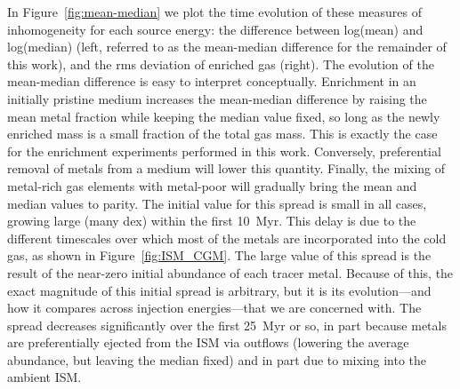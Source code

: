 \documentclass[twocolumn]{aastex62}
\begin{document}

In Figure~\ref{fig:mean-median} we plot the time evolution of these measures of inhomogeneity for each source energy: the difference between log(mean) and log(median) (left, referred to as the mean-median difference for the remainder of this work), and the rms deviation of enriched gas (right). The evolution of the mean-median difference is easy to interpret conceptually. Enrichment in an initially pristine medium increases the mean-median difference by raising the mean metal fraction while keeping the median value fixed, so long as the newly enriched mass is a small fraction of the total gas mass. This is exactly the case for the enrichment experiments performed in this work. Conversely, preferential removal of metals from a medium will lower this quantity. Finally, the mixing of metal-rich gas elements with metal-poor will gradually bring the mean and median values to parity. The initial value for this spread is small in all cases, growing large (many dex) within the first 10~Myr. This delay is due to the different timescales over which most of the metals are incorporated into the cold gas, as shown in Figure~\ref{fig:ISM_CGM}. The large value of this spread is the result of the near-zero initial abundance of each tracer metal. Because of this, the exact magnitude of this initial spread is arbitrary, but it is its evolution---and how it compares across injection energies---that we are concerned with. The spread decreases significantly over the first 25~Myr or so, in part because metals are preferentially ejected from the ISM via outflows (lowering the average abundance, but leaving the median fixed) and in part due to mixing into the ambient ISM. 

\end{document}
